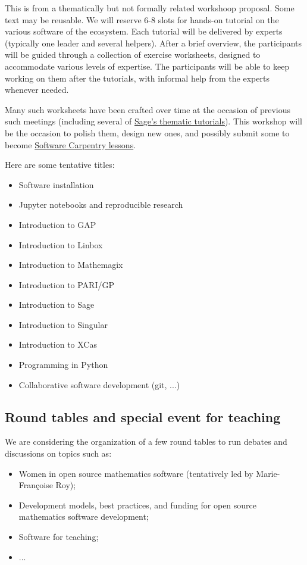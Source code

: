 \begin{oldpart}{This is from a thematically but not formally related workshoop proposal. Some text may be reusable.}
We will reserve 6-8 slots for hands-on tutorial on the various
software of the ecosystem. Each tutorial will be delivered by experts
(typically one leader and several helpers). After a brief overview,
the participants will be guided through a collection of exercise
worksheets, designed to accommodate various levels of expertise.  The
participants will be able to keep working on them after the tutorials,
with informal help from the experts whenever needed.

Many such worksheets have been crafted over time at the occasion of
previous such meetings (including several of
\href{http://doc.sagemath.org/html/en/thematic_tutorials/}{Sage's
  thematic tutorials}). This workshop will be the occasion to polish them,
design new ones, and possibly submit some to become
\href{http://software-carpentry.org/lessons/}{Software Carpentry lessons}.

Here are some tentative titles:
\begin{itemize}
\item Software installation
\item Jupyter notebooks and reproducible research
\item Introduction to GAP
\item Introduction to Linbox
\item Introduction to Mathemagix
\item Introduction to PARI/GP
\item Introduction to Sage
\item Introduction to Singular
\item Introduction to XCas
\item Programming in Python
\item Collaborative software development (git, ...)
\end{itemize}

\subsection{Round tables and special event for teaching}

We are considering the organization of a few round tables to run
debates and discussions on topics such as:

\begin{itemize}
\item Women in open source mathematics software (tentatively led by
  Marie-Françoise Roy);
\item Development models, best practices, and funding for open source
  mathematics software development;
\item Software for teaching;
\item ...
\end{itemize}


\end{oldpart}
